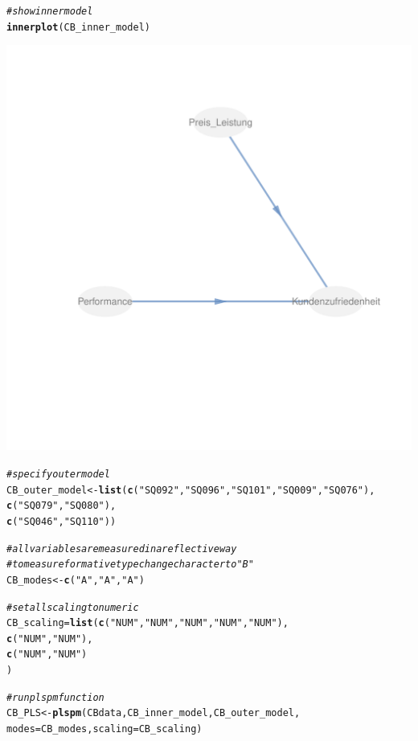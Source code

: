 \documentclass{article}\usepackage[]{graphicx}\usepackage[]{color}
\makeatletter
\def\maxwidth{ %
  \ifdim\Gin@nat@width>\linewidth
    \linewidth
  \else
    \Gin@nat@width
  \fi
}
\newcommand{\hlstr}[1]{\textcolor[rgb]{0.192,0.494,0.8}{#1}}%
\newcommand{\hlcom}[1]{\textcolor[rgb]{0.678,0.584,0.686}{\textit{#1}}}%
\newcommand{\hlstd}[1]{\textcolor[rgb]{0.345,0.345,0.345}{#1}}%
\newcommand{\hlkwb}[1]{\textcolor[rgb]{0.69,0.353,0.396}{#1}}%
\newcommand{\hlkwc}[1]{\textcolor[rgb]{0.333,0.667,0.333}{#1}}%
\newcommand{\hlkwd}[1]{\textcolor[rgb]{0.737,0.353,0.396}{\textbf{#1}}}%
\newenvironment{kframe}{%
 \def\at@end@of@kframe{}%
 \ifinner\ifhmode%
  \def\at@end@of@kframe{\end{minipage}}%
  \begin{minipage}{\columnwidth}%
 \fi\fi%
 \def\FrameCommand##1{\hskip\@totalleftmargin \hskip-\fboxsep
 \colorbox{shadecolor}{##1}\hskip-\fboxsep
     \hskip-\linewidth \hskip-\@totalleftmargin \hskip\columnwidth}%
 \MakeFramed {\advance\hsize-\width
   \@totalleftmargin\z@ \linewidth\hsize
   \@setminipage}}%
 {\par\unskip\endMakeFramed%
 \at@end@of@kframe}
\newenvironment{knitrout}{}{} %
\makeatother
\begin{document}
\begin{knitrout}
\begin{kframe}
\begin{alltt}
\hlcom{#show inner model}
\hlkwd{innerplot}\hlstd{(CB_inner_model)}
\end{alltt}
\end{kframe}
\includegraphics[width=\maxwidth]{figure/plspm} 
\begin{kframe}\begin{alltt}
\hlcom{#specify outer model}
\hlstd{CB_outer_model} \hlkwb{<-} \hlkwd{list}\hlstd{(}\hlkwd{c}\hlstd{(}\hlstr{"SQ092"}\hlstd{,}\hlstr{"SQ096"}\hlstd{,}\hlstr{"SQ101"}\hlstd{,}\hlstr{"SQ009"}\hlstd{,}\hlstr{"SQ076"}\hlstd{),}
                       \hlkwd{c}\hlstd{(}\hlstr{"SQ079"}\hlstd{,}\hlstr{"SQ080"}\hlstd{),}
                       \hlkwd{c}\hlstd{(}\hlstr{"SQ046"}\hlstd{,}\hlstr{"SQ110"}\hlstd{))}

\hlcom{#all variables are measured in a reflective way}
\hlcom{#to measure formative type change character to "B"}
\hlstd{CB_modes} \hlkwb{<-} \hlkwd{c}\hlstd{(}\hlstr{"A"}\hlstd{,}\hlstr{"A"}\hlstd{,}\hlstr{"A"}\hlstd{)}

\hlcom{#set all scaling to numeric}
\hlstd{CB_scaling} \hlkwb{=} \hlkwd{list}\hlstd{(}\hlkwd{c}\hlstd{(}\hlstr{"NUM"}\hlstd{,} \hlstr{"NUM"}\hlstd{,}\hlstr{"NUM"}\hlstd{,} \hlstr{"NUM"}\hlstd{,} \hlstr{"NUM"}\hlstd{),}
                  \hlkwd{c}\hlstd{(}\hlstr{"NUM"}\hlstd{,} \hlstr{"NUM"}\hlstd{),}
                  \hlkwd{c}\hlstd{(}\hlstr{"NUM"}\hlstd{,} \hlstr{"NUM"}\hlstd{)}
\hlstd{)}

\hlcom{#run plspm function}
\hlstd{CB_PLS} \hlkwb{<-} \hlkwd{plspm}\hlstd{(CBdata,CB_inner_model,CB_outer_model,}
                \hlkwc{modes} \hlstd{= CB_modes,} \hlkwc{scaling} \hlstd{= CB_scaling)}
\end{alltt}


{\ttfamily\noindent\bfseries\color{errorcolor}{\#\# Error: Fehlender Wert, wo TRUE/FALSE nötig ist}}\end{kframe}
\end{knitrout}
\end{document}

